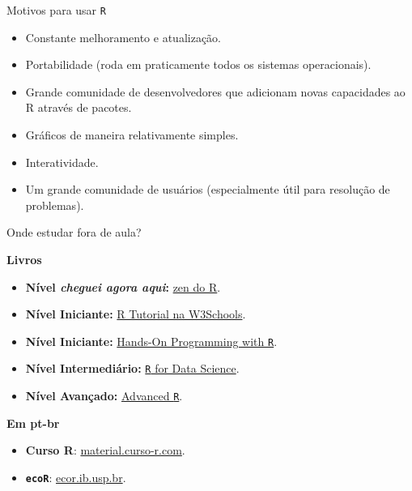 \documentclass[
  10pt,
  ignorenonframetext,
]{beamer}
\providecommand{\tightlist}{%
  \setlength{\itemsep}{0pt}\setlength{\parskip}{0pt}}
\begin{document}
\begin{frame}{Motivos para usar \texttt{R}}
\protect\hypertarget{motivos-para-usar-r}{}
\large

\begin{itemize}
\tightlist
\item
  Constante melhoramento e atualização.
\item
  Portabilidade (roda em praticamente todos os sistemas operacionais).
\item
  Grande comunidade de desenvolvedores que adicionam novas capacidades
  ao R através de pacotes.
\item
  Gráficos de maneira relativamente simples.
\item
  Interatividade.
\item
  Um grande comunidade de usuários (especialmente útil para resolução de
  problemas).
\end{itemize}

\normalsize
\end{frame}

\begin{frame}[fragile]{Onde estudar fora de aula?}
\protect\hypertarget{onde-estudar-fora-de-aula}{}
\large

\textbf{Livros}

\begin{itemize}
\tightlist
\item
  \textbf{Nível \emph{cheguei agora aqui}:}
  \href{https://curso-r.github.io/zen-do-r/index.html}{zen do R}.
\item
  \textbf{Nível Iniciante:}
  \href{https://www.w3schools.com/r/default.asp}{R Tutorial na
  W3Schools}.
\item
  \textbf{Nível Iniciante:}
  \href{https://rstudio-education.github.io/hopr/}{Hands-On Programming
  with \texttt{R}}.
\item
  \textbf{Nível Intermediário:} \href{https://r4ds.had.co.nz}{\texttt{R}
  for Data Science}.
\item
  \textbf{Nível Avançado:} \href{https://adv-r.hadley.nz}{Advanced
  \texttt{R}}.
\end{itemize}

\textbf{Em pt-br}

\begin{itemize}
\tightlist
\item
  \textbf{Curso R}:
  \href{http://material.curso-r.com/}{material.curso-r.com}.
\item
  \textbf{\texttt{ecoR}}: \href{http://ecor.ib.usp.br/}{ecor.ib.usp.br}.
\end{itemize}

\normalsize
\end{frame}
\end{document}
